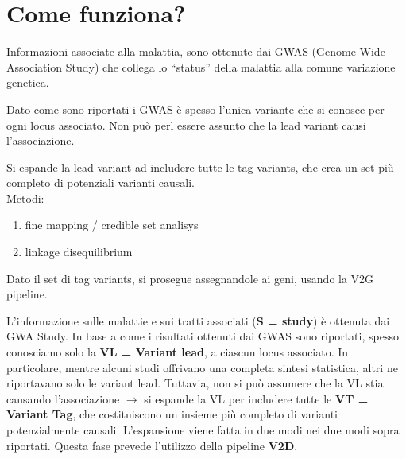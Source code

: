 \documentclass{article}
\begin{document}
\section{Come funziona?}
\begin{box2}
    [title={\textbf{S = Study, Desease Association Information}}]
    {Informazioni associate alla malattia, sono ottenute dai GWAS (Genome Wide Association Study) che collega lo “status” della malattia alla comune variazione genetica.}
\end{box2}

\begin{box2}
    [title={\textbf{$V_L$ = Lead Variant}}]
    {Dato come sono riportati i GWAS è spesso l'unica variante che si conosce per ogni locus associato. Non può perl essere assunto che la lead variant causi l'associazione.}
\end{box2}

\begin{box2}
    [title={\textbf{$V_T$ = Tag Variants}}]
    {Si espande la lead variant ad includere tutte le tag variants, che crea un set più completo di potenziali varianti causali.\\
    Metodi:
    \begin{enumerate}
        \item fine mapping / credible set analisys
        \item linkage disequilibrium
    \end{enumerate}
    }
\end{box2}

\begin{box2}
    [title={\textbf{G = Genes}}]
    {Dato il set di tag variants, si prosegue assegnandole ai geni, usando la V2G pipeline.}
\end{box2}

L'informazione sulle malattie e sui tratti associati (\textbf{S = study}) è ottenuta dai GWA Study. 
In base a come i risultati ottenuti dai GWAS sono riportati, spesso conosciamo solo la \textbf{VL = Variant lead}, a ciascun locus associato. In particolare, mentre alcuni studi offrivano una completa sintesi statistica, altri ne riportavano solo le variant lead. 
Tuttavia, non si può assumere che la VL stia causando l'associazione $\rightarrow$ si espande la VL  per includere tutte le \textbf{VT  = Variant Tag}, che costituiscono un insieme più completo di varianti potenzialmente causali. 
L'espansione viene fatta in due modi nei due modi sopra riportati. Questa fase prevede l'utilizzo della pipeline \textbf{V2D}.
\end{document}
